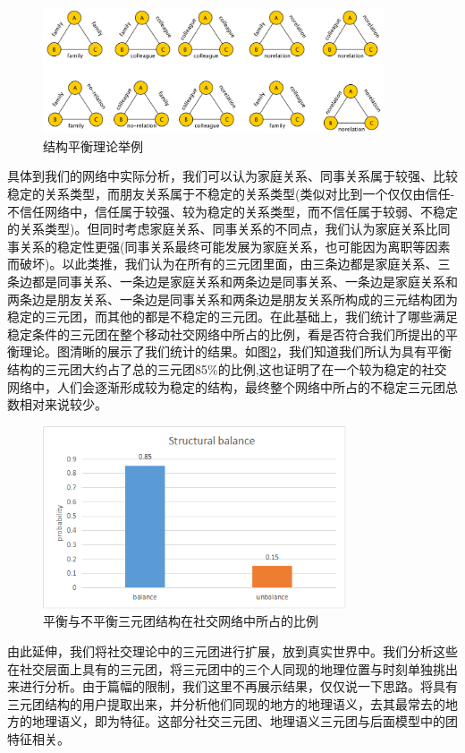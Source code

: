 \begin{figure}[ht]
    \centering
    \includegraphics[scale=1, width=0.9\textwidth]{figure/relations.PNG}
    \caption{结构平衡理论举例}
    \label{fig-structral-balance}
\end{figure}


具体到我们的网络中实际分析，我们可以认为家庭关系、同事关系属于较强、比较稳定的关系类型，而朋友关系属于不稳定的关系类型(类似对比到一个仅仅由信任-不信任网络中，信任属于较强、较为稳定的关系类型，而不信任属于较弱、不稳定的关系类型)。但同时考虑家庭关系、同事关系的不同点，我们认为家庭关系比同事关系的稳定性更强(同事关系最终可能发展为家庭关系，也可能因为离职等因素而破坏)。以此类推，我们认为在所有的三元团里面，由三条边都是家庭关系、三条边都是同事关系、一条边是家庭关系和两条边是同事关系、一条边是家庭关系和两条边是朋友关系、一条边是同事关系和两条边是朋友关系所构成的三元结构团为稳定的三元团，而其他的都是不稳定的三元团。在此基础上，我们统计了哪些满足稳定条件的三元团在整个移动社交网络中所占的比例，看是否符合我们所提出的平衡理论。图清晰的展示了我们统计的结果。如图\ref{fig-structral-balance-stat}，我们知道我们所认为具有平衡结构的三元团大约占了总的三元团85\%的比例,这也证明了在一个较为稳定的社交网络中，人们会逐渐形成较为稳定的结构，最终整个网络中所占的不稳定三元团总数相对来说较少。





\begin{figure}[ht]
    \centering
    \includegraphics[scale=1, width=0.8\textwidth]{figure/structural_balance.PNG}
    \caption{平衡与不平衡三元团结构在社交网络中所占的比例}
    \label{fig-structral-balance-stat}
\end{figure}


由此延伸，我们将社交理论中的三元团进行扩展，放到真实世界中。我们分析这些在社交层面上具有的三元团，将三元团中的三个人同现的地理位置与时刻单独挑出来进行分析。由于篇幅的限制，我们这里不再展示结果，仅仅说一下思路。将具有三元团结构的用户提取出来，并分析他们同现的地方的地理语义，去其最常去的地方的地理语义，即为特征。这部分社交三元团、地理语义三元团与后面模型中的团特征相关。







